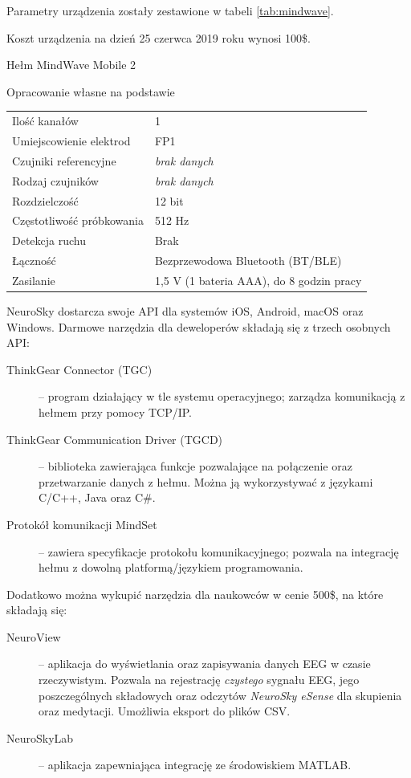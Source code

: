 \documentclass[skorowidz,skroty]{dyplomWEZUT}
\begin{document}
Parametry urządzenia zostały zestawione w tabeli \vref{tab:mindwave}.

Koszt urządzenia na dzień 25 czerwca 2019 roku wynosi 100\$.

{Hełm MindWave Mobile 2\label{fig:mindwave}}
{\cite{mindwave}}

{Opracowanie własne na podstawie \cite{mindwave}}
{
    \begin{tabular}{l|l}
        Ilość kanałów & 1\\
        Umiejscowienie elektrod & FP1\\
        Czujniki referencyjne & \textit{brak danych}\\
        Rodzaj czujników & \textit{brak danych}\\
        Rozdzielczość & 12 bit\\
        Częstotliwość próbkowania & 512 Hz\\
        Detekcja ruchu & Brak\\
        Łączność & Bezprzewodowa Bluetooth (BT/BLE)\\
        Zasilanie & 1,5 V (1 bateria AAA), do 8 godzin pracy
    \end{tabular}
}

NeuroSky dostarcza swoje API dla systemów iOS, Android, macOS oraz Windows. Darmowe narzędzia dla deweloperów składają się z trzech osobnych API\cite{mindwave_software}:

\begin{description}
    \item [ThinkGear Connector (TGC)] -- program działający w tle systemu operacyjnego; zarządza komunikacją z hełmem przy pomocy TCP/IP.
    \item [ThinkGear Communication Driver (TGCD)] -- biblioteka zawierająca funkcje pozwalające na połączenie oraz przetwarzanie danych z hełmu. Można ją wykorzystywać z językami C/C++, Java oraz C\#.
    \item [Protokół komunikacji MindSet] -- zawiera specyfikacje protokołu komunikacyjnego; pozwala na integrację hełmu z dowolną platformą/językiem programowania.
\end{description}

Dodatkowo można wykupić narzędzia dla naukowców w cenie 500\$, na które składają się\cite{mindwave_research}:

\begin{description}
    \item [NeuroView] -- aplikacja do wyświetlania oraz zapisywania danych EEG w czasie rzeczywistym. Pozwala na rejestrację \textit{czystego} sygnału EEG, jego poszczególnych składowych oraz odczytów \textit{NeuroSky eSense} dla skupienia oraz medytacji. Umożliwia eksport do plików CSV.
    \item [NeuroSkyLab] -- aplikacja zapewniająca integrację ze środowiskiem MATLAB.
\end{description}
\end{document}
